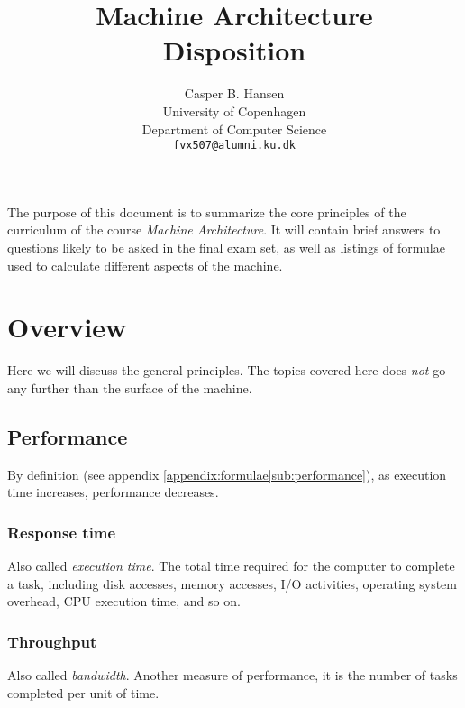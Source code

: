 \documentclass[11pt,a4paper]{article}
\title
{
	{\large Machine Architecture} \\
	Disposition	
}
\author
{
	Casper B. Hansen \\
	University of Copenhagen \\
	Department of Computer Science \\
	{\tt fvx507@alumni.ku.dk}
}
\newcommand{\appendixref}[1]{(see appendix \ref{#1})}
\begin{document}
\clearpage\maketitle\thispagestyle{empty}
\begin{multicols}{2}
\abstract
{
	\noindent
	The purpose of this document is to summarize the core principles of the
	curriculum of the course {\it Machine Architecture}. It will contain brief
	answers to questions likely to be asked in the final exam set, as well as
	listings of formulae used to calculate different aspects of the machine.
}
\vfill
\columnbreak
\tableofcontents
\end{multicols}

\newpage
\section{Overview}
Here we will discuss the general principles. The topics covered here does
{\it not} go any further than the surface of the machine.

\subsection{Performance}
By definition \appendixref{appendix:formulae|sub:performance}, as execution
time increases, performance decreases.

\begin{multicols}{2}
\subsubsection{Response time}
Also called {\it execution time}. The total time required for the computer to
complete a task, including disk accesses, memory accesses, I/O activities,
operating system overhead, CPU execution time, and so on.
\vfill
\columnbreak
\subsubsection{Throughput}
Also called {\it bandwidth}. Another measure of performance, it is the number
of tasks completed per unit of time.
\end{multicols}




\end{document}
